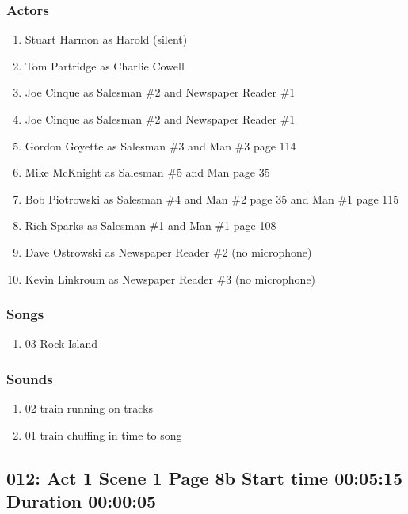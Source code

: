 \subsubsection{Actors}
\begin{enumerate}
\item Stuart Harmon as Harold (silent)
\item Tom Partridge as Charlie Cowell
\item Joe Cinque as Salesman \#2 and Newspaper Reader \#1
\item Joe Cinque as Salesman \#2 and Newspaper Reader \#1
\item Gordon Goyette as Salesman \#3 and Man \#3 page 114
\item Mike McKnight as Salesman \#5 and Man page 35
\item Bob Piotrowski as Salesman \#4 and Man \#2 page 35 and Man \#1 page 115
\item Rich Sparks as Salesman \#1 and Man \#1 page 108
\item Dave Ostrowski as Newspaper Reader \#2 (no microphone)
\item Kevin Linkroum as Newspaper Reader \#3 (no microphone)
\end{enumerate}

\subsubsection{Songs}
\begin{enumerate}
\item 03 Rock Island
\end{enumerate}\subsubsection{Sounds}
\begin{enumerate}
\item 02 train running on tracks
\item 01 train chuffing in time to song
\end{enumerate}
\subsection{012: Act 1 Scene 1 Page 8b Start time 00:05:15 Duration 00:00:05}

